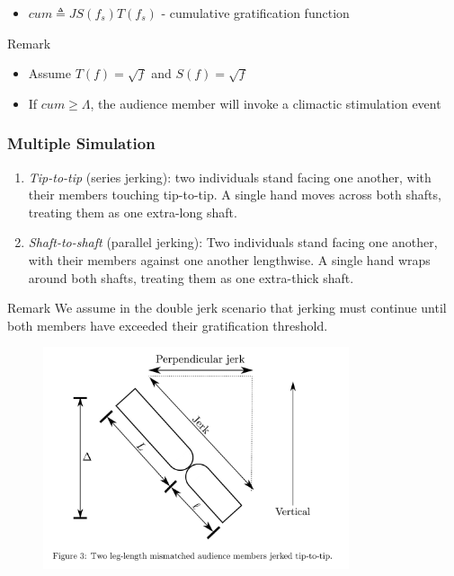 \documentclass{beamer}
\begin{document}
\begin{frame}
    \begin{itemize}
        \item $cum \triangleq JS(f_s)T(f_s)$ - cumulative gratification function\\
    \end{itemize}

    
    \begin{block}{Remark}
        \begin{itemize}
            \item Assume $T(f) = \sqrt{f}$ and $S(f) = \sqrt{f}$\\

            \item If $cum \geq \Lambda$, the audience member will invoke a climactic stimulation event\\
        \end{itemize}
    \end{block}


\end{frame}

\begin{frame}
    \frametitle{Multiple Simulation}

    \begin{enumerate}
        \item \textit{Tip-to-tip} (series jerking): two individuals stand facing one another, with their members touching tip-to-tip. A single hand moves across both shafts, treating them as one extra-long shaft.
        \item \textit{Shaft-to-shaft} (parallel jerking): Two individuals stand facing one another, with their members against one another lengthwise. A single hand wraps around both shafts, treating them as one extra-thick shaft.
    \end{enumerate}

    \begin{block}{Remark}
        We assume in the double jerk scenario that jerking \alert{must continue} until both members have exceeded their gratification threshold.
    \end{block}
\end{frame}

\begin{frame}
    \begin{figure}
        \includegraphics[width=9cm]{t2t}
    \end{figure}
\end{frame}
\end{document}
